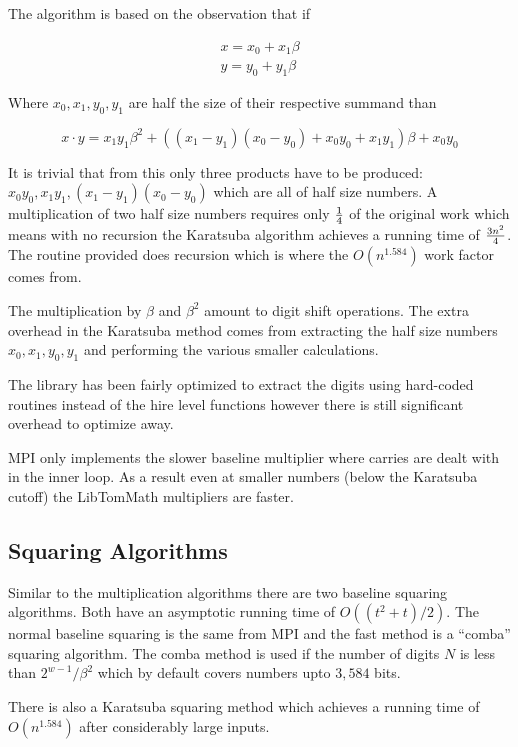 \documentclass{article}
\begin{document}
The algorithm is based on the observation that if 

\begin{eqnarray}
x = x_0 + x_1\beta \nonumber \\
y = y_0 + y_1\beta
\end{eqnarray}

Where $x_0, x_1, y_0, y_1$ are half the size of their respective summand than 

\begin{equation}
x \cdot y = x_1y_1\beta^2 + ((x_1 - y_1)(x_0 - y_0) + x_0y_0 + x_1y_1)\beta + x_0y_0
\end{equation}

It is trivial that from this only three products have to be produced: $x_0y_0, x_1y_1, (x_1-y_1)(x_0-y_0)$ which
are all of half size numbers.  A multiplication of two half size numbers requires only $1 \over 4$ of the
original work which means with no recursion the Karatsuba algorithm achieves a running time of ${3n^2}\over 4$.  
The routine provided does recursion which is where the $O(n^{1.584})$ work factor comes from.

The multiplication by $\beta$ and $\beta^2$ amount to digit shift operations.  
The extra overhead in the Karatsuba method comes from extracting the half size numbers $x_0, x_1, y_0, y_1$ and
performing the various smaller calculations.  

The library has been fairly optimized to extract the digits using hard-coded routines instead of the hire
level functions however there is still significant overhead to optimize away.

MPI only implements the slower baseline multiplier where carries are dealt with in the inner loop.  As a result even at
smaller numbers (below the Karatsuba cutoff) the LibTomMath multipliers are faster.

\subsection{Squaring Algorithms}

Similar to the multiplication algorithms there are two baseline squaring algorithms.  Both have an asymptotic 
running time of $O((t^2 + t)/2)$.  The normal baseline squaring is the same from MPI and the fast method is 
a ``comba'' squaring algorithm.  The comba method is used if the number of digits $N$ is less than 
$2^{w-1}/\beta^2$ which by default covers numbers upto $3,584$ bits.  

There is also a Karatsuba squaring method which achieves a running time of $O(n^{1.584})$ after considerably large
inputs.
\end{document}
